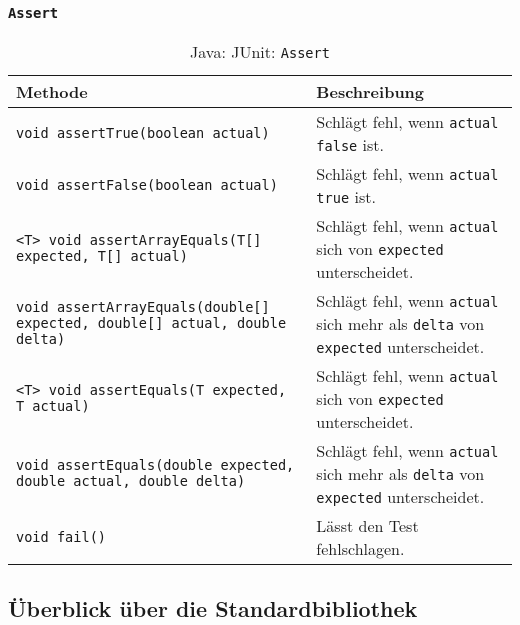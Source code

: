 \subsubsection{\texttt{Assert}}
\begin{sidewaystable}
	\centering
	\begin{tabular}{l | p{8cm}}
		Methode                                                                           & Beschreibung                                                                                         \\
		\hline
		\texttt{void assertTrue(boolean actual)}                                          & Schlägt fehl, wenn \texttt{actual} \texttt{false} ist.                                               \\
		\texttt{void assertFalse(boolean actual)}                                         & Schlägt fehl, wenn \texttt{actual} \texttt{true} ist.                                                \\
		\texttt{<T> void assertArrayEquals(T[] expected, T[] actual)}                     & Schlägt fehl, wenn \texttt{actual} sich von \texttt{expected} unterscheidet.                         \\
		\texttt{void assertArrayEquals(double[] expected, double[] actual, double delta)} & Schlägt fehl, wenn \texttt{actual} sich mehr als \texttt{delta} von \texttt{expected} unterscheidet. \\
		\texttt{<T> void assertEquals(T expected, T actual)}                              & Schlägt fehl, wenn \texttt{actual} sich von \texttt{expected} unterscheidet.                         \\
		\texttt{void assertEquals(double expected, double actual, double delta)}          & Schlägt fehl, wenn \texttt{actual} sich mehr als \texttt{delta} von \texttt{expected} unterscheidet. \\
		\texttt{void fail()}                                                              & Lässt den Test fehlschlagen.                                                                         \\
	\end{tabular}
	\caption{Java: JUnit: \texttt{Assert}}
\end{sidewaystable}




\subsection{Überblick über die Standardbibliothek}
